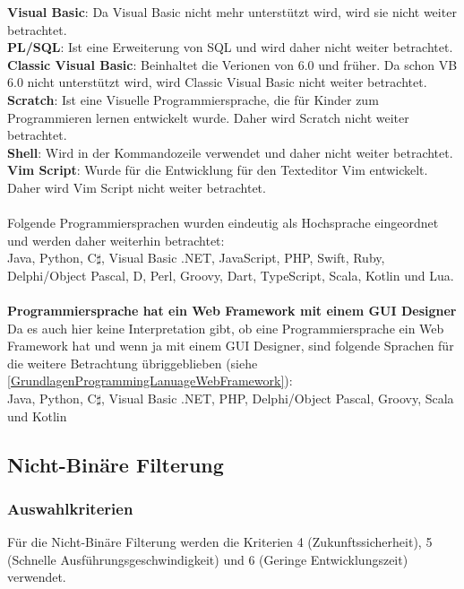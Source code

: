 \documentclass[ngerman]{article}
\begin{document}
    \textbf{Visual Basic}: Da Visual Basic nicht mehr unterstützt wird, wird sie nicht weiter betrachtet.\\
    \textbf{PL/SQL}: Ist eine Erweiterung von SQL und wird daher nicht weiter betrachtet.\\
    \textbf{Classic Visual Basic}: Beinhaltet die Verionen von 6.0 und früher. Da schon VB 6.0 nicht unterstützt wird, wird Classic Visual Basic nicht weiter betrachtet.\\
    \textbf{Scratch}: Ist eine Visuelle Programmiersprache, die für Kinder zum Programmieren lernen entwickelt wurde. Daher wird Scratch nicht weiter betrachtet.\\
    \textbf{Shell}: Wird in der Kommandozeile verwendet und daher nicht weiter betrachtet.\\
    \textbf{Vim Script}: Wurde für die Entwicklung für den Texteditor Vim entwickelt. Daher wird Vim Script nicht weiter betrachtet.\\\\
    Folgende Programmiersprachen wurden eindeutig als Hochsprache eingeordnet und werden daher weiterhin betrachtet:\\
    Java, Python, C$\sharp$, Visual Basic .NET, JavaScript, PHP, Swift, Ruby, Delphi/Object Pascal, D, Perl, Groovy, Dart, TypeScript, Scala, Kotlin und Lua.\\\\
    \textbf{Programmiersprache hat ein Web Framework mit einem GUI Designer}\\
    Da es auch hier keine Interpretation gibt, ob eine Programmiersprache ein Web Framework hat und wenn ja mit einem GUI Designer, sind folgende Sprachen für die weitere Betrachtung übriggeblieben (siehe \ref{GrundlagenProgrammingLanuageWebFramework}):\\
    Java, Python, C$\sharp$, Visual Basic .NET, PHP, Delphi/Object Pascal, Groovy, Scala und Kotlin
    \subsection{Nicht-Binäre Filterung}
    \subsubsection{Auswahlkriterien}
    Für die Nicht-Binäre Filterung werden die Kriterien 4 (Zukunftssicherheit), 5 (Schnelle Ausführungsgeschwindigkeit) und 6 (Geringe Entwicklungszeit) verwendet.
\end{document}
